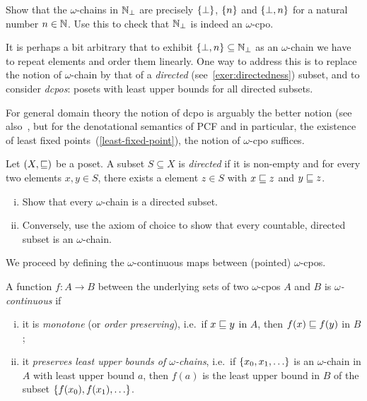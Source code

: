 \begin{exercise}\label{exer:N_bot}
  Show that the \(\omega\)-chains in \(\mathbb N_\bot\) are precisely \(\{\bot\}\),
  \(\{n\}\) and \(\{\bot,n\}\) for a natural number \(n \in \mathbb N\).
  Use this to check that \(\mathbb N_\bot\) is indeed an \(\omega\)-cpo.
\end{exercise}

\begin{remark}
  It is perhaps a bit arbitrary that to exhibit
  \(\{\bot,n\} \subseteq \mathbb N_\bot\) as an \(\omega\)-chain we have to repeat
  elements and order them linearly.
  One way to address this is to replace the notion of \(\omega\)-chain by that
  of a \emph{directed} (see~\cref{exer:directedness}) subset, and to consider
  \emph{dcpos}: posets with least upper bounds for all directed subsets.

  For general domain theory the notion of dcpo is arguably the better notion
  (see also~\cite[Section~2.2.4]{AbramskyJung1994}, but for the denotational
  semantics of PCF and in particular, the existence of least fixed
  points~(\cref{least-fixed-point}), the notion of \(\omega\)-cpo suffices.
\end{remark}

\begin{exercise}\label{exer:directedness}
  Let \((X,{\sqsubseteq})\) be a poset. A subset \(S \subseteq X\) is \emph{directed}
  if it is non-empty and for every two elements \(x,y \in S\), there exists a
  element \(z \in S\) with \(x \sqsubseteq z\) and \(y \sqsubseteq z\).
  \begin{enumerate}[(i)]
  \item Show that every \(\omega\)-chain is a directed subset.
  \item Conversely, use the axiom of choice to show that every countable,
    directed subset is an \(\omega\)-chain.
  \end{enumerate}
\end{exercise}

We proceed by defining the \(\omega\)-continuous maps between (pointed)
\(\omega\)-cpos.
\begin{definition}\label{def:continuity}
  A function \(f \colon A \to B\) between the underlying sets of two
  \(\omega\)-cpos \(A\) and \(B\) is \emph{\(\omega\)-continuous} if
  \begin{enumerate}[(i)]
  \item\label{monotone} it is \emph{monotone} (or \emph{order preserving}),
    i.e.\ if \(x \sqsubseteq y\) in \(A\), then \(f(x) \sqsubseteq f(y)\) in \(B\);
  \item\label{preserve-lub-of-omega-chains} it \emph{preserves least upper
      bounds of \(\omega\)-chains}, i.e.\ if \(\set{x_0,x_1,\dots}\) is an
    \(\omega\)-chain in \(A\) with least upper bound \(a\), then \(f(a)\) is the
    least upper bound in \(B\) of the subset \(\set{f(x_0),f(x_1),\dots}\).
  \end{enumerate}
\end{definition}

